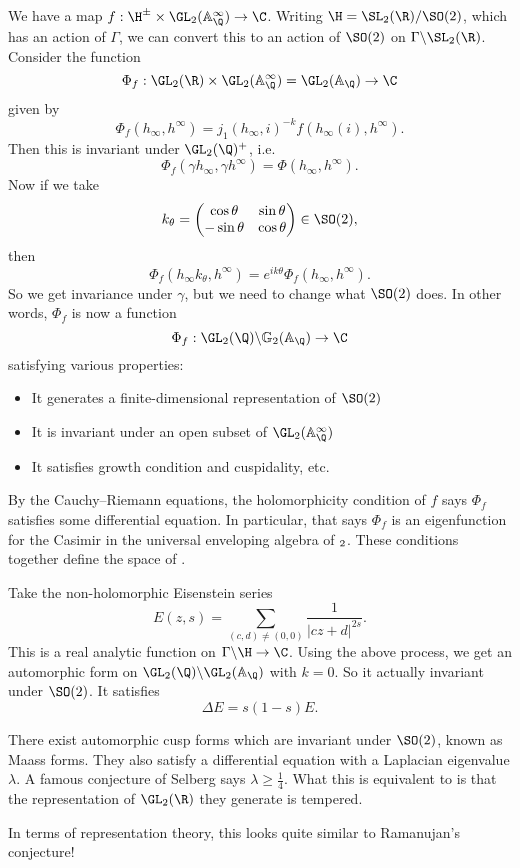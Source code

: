 \documentclass[a4paper]{article}
\renewcommand\G{\mathbb{G}}
\newcommand\A{\mathbb{A}}
\begin{document}
We have a map $f: \H^{\pm} \times \GL_2(\A_\Q^\infty) \to \C$. Writing $\H = \SL_2(\R)/\SO(2)$, which has an action of $\Gamma$, we can convert this to an action of $\SO(2)$ on $\Gamma \backslash \SL_2(\R)$. Consider the function
\[
  \Phi_f: \GL_2(\R) \times \GL_2(\A_\Q^\infty) = \GL_2(\A_\Q) \to \C
\]
given by
\[
  \Phi_f(h_\infty, h^\infty) = j_1(h_\infty, i)^{-k} f(h_\infty(i), h^\infty).
\]
Then this is invariant under $\GL_2(\Q)^+$, i.e.
\[
  \Phi_f(\gamma h_\infty, \gamma h^\infty) = \Phi(h_\infty, h^\infty).
\]
Now if we take
\[
  k_\theta =
  \begin{pmatrix}
    \cos \theta & \sin \theta\\
    -\sin \theta & \cos \theta
  \end{pmatrix} \in \SO(2),
\]
then
\[
  \Phi_f(h_\infty k_\theta, h^\infty) = e^{ik\theta} \Phi_f(h_\infty, h^\infty).
\]
So we get invariance under $\gamma$, but we need to change what $\SO(2)$ does. In other words, $\Phi_f$ is now a function
\[
  \Phi_f: \GL_2(\Q) \backslash \G_2(\A_\Q) \to \C
\]
satisfying various properties:
\begin{itemize}
  \item It generates a finite-dimensional representation of $\SO(2)$
  \item It is invariant under an open subset of $\GL_2(\A^\infty_\Q)$
  \item It satisfies growth condition and cuspidality, etc.
\end{itemize}
By the Cauchy--Riemann equations, the holomorphicity condition of $f$ says $\Phi_f$ satisfies some differential equation. In particular, that says $\Phi_f$ is an eigenfunction for the Casimir in the universal enveloping algebra of $\sl_2$. These conditions together define the space of .

\begin{eg}
  Take the non-holomorphic Eisenstein series
  \[
    E(z, s) = \sum_{(c, d) \not= (0, 0)} \frac{1}{|cz + d|^{2s}}.
  \]
  This is a real analytic function on $\Gamma \backslash \H \to \C$. Using the above process, we get an automorphic form on $\GL_2(\Q) \backslash \GL_2(\A_\Q)$ with $k = 0$. So it actually invariant under $\SO(2)$. It satisfies
  \[
    \Delta E = s(1 - s) E.
  \]
\end{eg}
There exist automorphic cusp forms which are invariant under $\SO(2)$, known as Maass forms. They also satisfy a differential equation with a Laplacian eigenvalue $\lambda$. A famous conjecture of Selberg says $\lambda \geq \frac{1}{4}$. What this is equivalent to is that the representation of $\GL_2(\R)$ they generate is tempered.

In terms of representation theory, this looks quite similar to Ramanujan's conjecture!
\printindex
\end{document}
